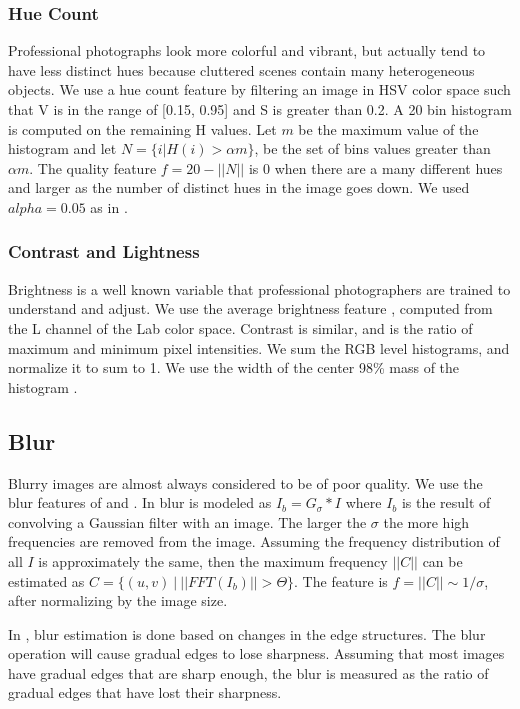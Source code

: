 \documentclass[conference,a4paper]{IEEEtran}
\begin{document}
  \subsubsection{Hue Count}
  Professional photographs look more colorful and vibrant, but actually tend to have less distinct hues because cluttered scenes contain many heterogeneous objects.  We use a hue count feature by filtering an image in HSV color space such that V is in the range of [0.15, 0.95] and S is greater than 0.2.  A 20 bin histogram is computed on the remaining H values.  Let $m$ be the maximum value of the histogram and let $N = \{i | H(i) > \alpha m\}$, be the set of bins values greater than $\alpha m$.  The quality feature $f = 20 - ||N||$ is 0 when there are a many different hues and larger as the number of distinct hues in the image goes down.  We used $alpha = 0.05$ as in \cite{ke2006design}.

  \subsubsection{Contrast and Lightness}
  Brightness is a well known variable that professional photographers are trained to understand and adjust.  We use the average brightness feature \cite{ke2006design}, \cite{chen2014aesthetic} computed from the L channel of the Lab color space.  Contrast is similar, and is the ratio of maximum and minimum pixel intensities.  We sum the RGB level histograms, and normalize it to sum to 1.  We use the width of the center 98\% mass of the histogram \cite{ke2006design}.

   \subsection{Blur}
  Blurry images are almost always considered to be of poor quality.  We use the blur features of \cite{ke2006design} and \cite{tong2004blur}.  In \cite{ke2006design} blur is modeled as $I_b = G_\sigma * I$ where $I_b$ is the result of convolving a Gaussian filter with an image.  The larger the $\sigma$ the more high frequencies are removed from the image.  Assuming the frequency distribution of all $I$ is approximately the same, then the maximum frequency $||C||$ can be estimated as $C = \{(u, v)\ |\ ||FFT(I_b)|| > \Theta\}$.  The feature is $f = ||C|| \sim 1/\sigma$, after normalizing by the image size.

  In \cite{tong2004blur}, blur estimation is done based on changes in the edge structures.  The blur operation will cause gradual edges to lose sharpness.  Assuming that most images have gradual edges that are sharp enough, the blur is measured as the ratio of gradual edges that have lost their sharpness.
\end{document}
